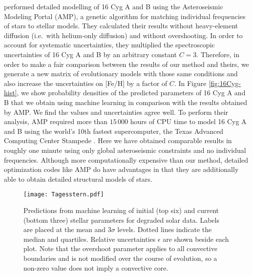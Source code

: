\documentclass[manuscript,linenumbers]{aastex6}
\begin{document}
\citet{2015ApJ...811L..37M} performed detailed modelling of 16 Cyg A and B using the Asteroseismic Modeling Portal (AMP), a genetic algorithm for matching individual frequencies of stars to stellar models. They calculated their results without heavy-element diffusion (i.e.\ with helium-only diffusion) and without overshooting. In order to account for systematic uncertainties, they multiplied the spectroscopic uncertainties of 16 Cyg A and B by an arbitrary constant $C=3$. Therefore, in order to make a fair comparison between the results of our method and theirs, we generate a new matrix of evolutionary models with those same conditions and also increase the uncertainties on [Fe/H] by a factor of $C$. In Figure \ref{fig:16Cyg-hist}, we show probability densities of the predicted parameters of 16 Cyg A and B that we obtain using machine learning in comparison with the results obtained by AMP. We find the values and uncertainties agree well. To perform their analysis, AMP required more than $15\,000$ hours of CPU time to model 16 Cyg A and B using the world's 10th fastest supercomputer, the Texas Advanced Computing Center Stampede \citep{TOP500}. Here we have obtained comparable results in roughly one minute using only global asteroseismic constraints and no individual frequencies. Although more computationally expensive than our method, detailed optimization codes like AMP do have advantages in that they are additionally able to obtain detailed structural models of stars. %

\begin{figure*}
    \centering
    \texttt{[image: Tagesstern.pdf]}
    \caption{Predictions from machine learning of initial (top six) and current (bottom three) stellar parameters for degraded solar data. Labels are placed at the mean and 3$\sigma$ levels. Dotted lines indicate the median and quartiles. Relative uncertainties $\epsilon$ are shown beside each plot. Note that the overshoot parameter applies to all convective boundaries and is not modified over the course of evolution, so a non-zero value does not imply a convective core. %
    \label{fig:corner} } 
\end{figure*}
\end{document}
